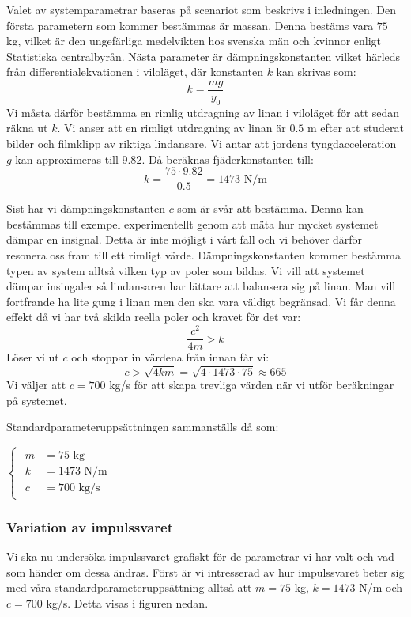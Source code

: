 Valet av systemparametrar baseras på scenariot som beskrivs i inledningen. Den första parametern som kommer bestämmas är massan. Denna bestäms vara $75$ kg,  vilket är den ungefärliga medelvikten hos svenska män och kvinnor enligt Statistiska centralbyrån.
Nästa parameter är dämpningskonstanten vilket härleds från differentialekvationen i viloläget, där konstanten $k$ kan skrivas som:
\newline$$k=\frac{mg}{y_0}$$\newline
Vi måsta därför bestämma en rimlig utdragning av linan i viloläget för att sedan räkna ut $k$. Vi anser att en rimligt utdragning av linan är $0.5$ m efter att studerat bilder och filmklipp av riktiga lindansare. Vi antar att jordens tyngdacceleration $g$ kan approximeras till $9.82$. Då beräknas fjäderkonstanten till:
\newline$$k=\frac{75 \cdot 9.82}{0.5}=1473 \text{ N/m}$$

Sist har vi dämpningskonstanten $c$ som är svår att bestämma. Denna kan bestämmas till exempel experimentellt genom att mäta hur mycket systemet dämpar en insignal. Detta är inte möjligt i vårt fall och vi behöver därför resonera oss fram till ett rimligt värde. Dämpningskonstanten kommer bestämma typen av system alltså vilken typ av poler som bildas. Vi vill att systemet dämpar insingaler så lindansaren har lättare att balansera sig på linan. Man vill fortfrande ha lite gung i linan men den ska vara väldigt begränsad. Vi får denna effekt då vi har två skilda reella poler och kravet för det var:
$$\frac{c^2}{4m} > k $$
Löser vi ut $c$ och stoppar in värdena från innan får vi:
$$c>\sqrt{4km}=\sqrt{4\cdot 1473\cdot 75} \approx 665$$
Vi väljer att $c=700$ kg/s för att skapa trevliga värden när vi utför beräkningar på systemet. 

Standardparameteruppsättningen sammanställs då som:

$\begin{cases}
\begin{aligned}
m&=75 \text{ kg} \\
k&=1473 \text{ N/m} \\
c&=700 \text{ kg/s}
\end{aligned}
\end{cases}$

\newpage
\subsubsection{Variation av impulssvaret}
Vi ska nu undersöka impulssvaret grafiskt för de parametrar vi har valt och vad som händer om dessa ändras. Först är vi intresserad av hur impulssvaret beter sig med våra standardparameteruppsättning alltså att $m = 75$ kg, $k=1473$ N/m och $c=700$ kg/s. Detta visas i figuren nedan.

